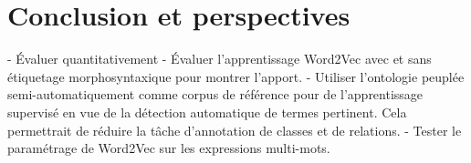 \section{Conclusion et perspectives}
-	Évaluer quantitativement
-	Évaluer l'apprentissage Word2Vec avec et sans étiquetage morphosyntaxique pour montrer l'apport.
-	Utiliser l'ontologie peuplée semi-automatiquement comme corpus de référence pour de l'apprentissage supervisé en vue de la détection automatique de termes pertinent. Cela permettrait de réduire la tâche d'annotation de classes et de relations.
-	Tester le paramétrage de Word2Vec sur les expressions multi-mots.
